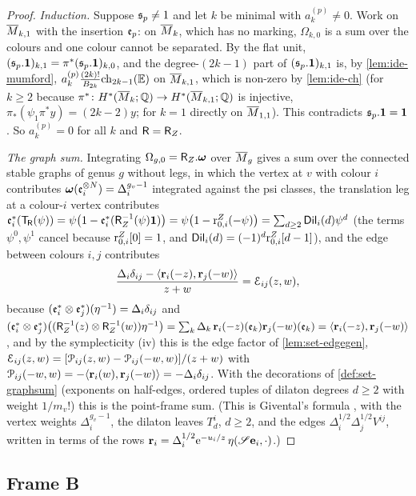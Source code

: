 \begin{proof}
\emph{Induction.} Suppose $\mathfrak{s}_p\neq 1$ and let $k$ be minimal with $a_k^{(p)}\neq 0$. Work on $\overline{M}_{k,1}$ with the insertion $\mathfrak{e}_p$: on $\overline{M}_k$, which has no marking, $\Omega_{k,0}$ is a sum over the colours and one colour cannot be separated. By the flat unit, $(\mathfrak{s}_p.\mathbf{1})_{k,1}=\pi^*(\mathfrak{s}_p.\mathbf{1})_{k,0}$, and the degree-$(2k-1)$ part of $(\mathfrak{s}_p.\mathbf{1})_{k,1}$ is, by \cref{lem:ide-mumford}, $a_k^{(p)}\frac{(2k)!}{B_{2k}}\mathrm{ch}_{2k-1}(\mathbb{E})$ on $\overline{M}_{k,1}$, which is non-zero by \cref{lem:ide-ch} (for $k\geq 2$ because $\pi^*\colon H^*(\overline{M}_k;\mathbb{Q})\to H^*(\overline{M}_{k,1};\mathbb{Q})$ is injective, $\pi_*(\psi_1\pi^*y)=(2k-2)y$; for $k=1$ directly on $\overline{M}_{1,1}$). This contradicts $\mathfrak{s}_p.\mathbf{1}=\mathbf{1}$. So $a^{(p)}_k=0$ for all $k$ and $\mathsf{R}=\mathsf{R}_{Z}$.

\emph{The graph sum.} Integrating $\Omega_{g,0}=\mathsf{R}_{Z}.\boldsymbol{\omega}$ over $\overline{M}_g$ gives a sum over the connected stable graphs of genus $g$ without legs, in which the vertex at $v$ with colour $i$ contributes $\boldsymbol{\omega}(\mathfrak{e}_i^{\otimes N})=\Delta_i^{g_v-1}$ integrated against the psi classes, the translation leg at a colour-$i$ vertex contributes $\mathfrak{e}_i^*(\mathsf{T}_{\!\mathsf{R}}(\psi))=\psi\big(1-\mathfrak{e}_i^*(\mathsf{R}_{Z}^{-1}(\psi)\mathbf{1})\big)=\psi\big(1-\mathrm{r}^{Z}_{0,i}(-\psi)\big)=\sum_{d\geq 2}\mathsf{Dil}_i(d)\psi^d$ (the terms $\psi^0,\psi^1$ cancel because $\mathrm{r}^{Z}_{0,i}[0]=1$, and $\mathsf{Dil}_i(d)=(-1)^d\mathrm{r}^{Z}_{0,i}[d-1]$), and the edge between colours $i,j$ contributes
\[
\frac{\Delta_i\delta_{ij}-\langle\mathbf{r}_i(-z),\mathbf{r}_j(-w)\rangle}{z+w}=\mathcal{E}_{ij}(z,w),
\]
because $(\mathfrak{e}_i^*\otimes\mathfrak{e}_j^*)(\eta^{-1})=\Delta_i\delta_{ij}$ and $(\mathfrak{e}_i^*\otimes\mathfrak{e}_j^*)\big((\mathsf{R}_{Z}^{-1}(z)\otimes\mathsf{R}_{Z}^{-1}(w))\eta^{-1}\big)=\sum_k\Delta_k\,\mathbf{r}_i(-z)(\mathfrak{e}_k)\mathbf{r}_j(-w)(\mathfrak{e}_k)=\langle\mathbf{r}_i(-z),\mathbf{r}_j(-w)\rangle$, and by the symplecticity (iv) this is the edge factor of \cref{lem:set-edgegen}, $\mathcal{E}_{ij}(z,w)=[\mathcal{P}_{ij}(z,w)-\mathcal{P}_{ij}(-w,w)]/(z+w)$ with $\mathcal{P}_{ij}(-w,w)=-\langle\mathbf{r}_i(w),\mathbf{r}_j(-w)\rangle=-\Delta_i\delta_{ij}$. With the decorations of \cref{def:set-graphsum} (exponents on half-edges, ordered tuples of dilaton degrees $d\geq 2$ with weight $1/m_v!$) this is the point-frame sum. (This is Givental's formula \cite[(1), (6), (7)]{Giv01}, with the vertex weights $\Delta_i^{g_v-1}$, the dilaton leaves $T^i_d$, $d\geq 2$, and the edges $\Delta_i^{1/2}\Delta_j^{1/2}V^{ij}$, written in terms of the rows $\mathbf{r}_i=\Delta_i^{1/2}\mathrm{e}^{-u_i/z}\,\eta(\mathscr{S}\mathbf{e}_i,\cdot)$.)
\end{proof}

\subsection{Frame B}

